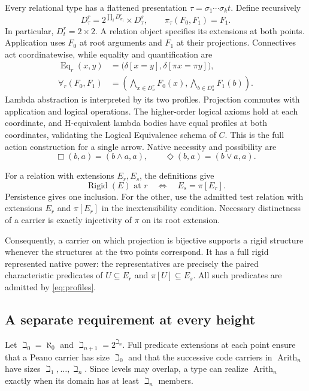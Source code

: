 \documentclass[11pt,letterpaper,numbers=noenddot]{scrartcl}
\numberwithin{equation}{section}
\theoremstyle{definition}
\newcommand{\Rigid}{\operatorname{Rigid}}
\newcommand{\Arith}{\operatorname{Arith}}
\begin{document}
Every relational type has a flattened presentation $\tau=\sigma_1\cdots\sigma_k t$. Define recursively
\begin{equation}\label{eq:profiles}
D_\tau^r=
2^{\prod_iD_{\sigma_i}^r}\times D_\tau^s,
\qquad
\pi_\tau(F_0,F_1)=F_1.
\end{equation}
In particular, $D_t^r=2\times2$. A relation object specifies its extensions at both points. Application uses $F_0$ at root arguments and $F_1$ at their projections. Connectives act coordinatewise, while equality and quantification are
\begin{align}
\operatorname{Eq}_r(x,y)
 &=\bigl(\delta[x=y],\delta[\pi x=\pi y]\bigr),\label{eq:model-eq}\\
\forall_r(F_0,F_1)
 &=\left(\bigwedge_{x\in D_\sigma^r}F_0(x),
          \bigwedge_{b\in D_\sigma^s}F_1(b)\right).
\end{align}
Lambda abstraction is interpreted by its two profiles. Projection commutes with application and logical operations. The higher-order logical axioms hold at each coordinate, and H-equivalent lambda bodies have equal profiles at both coordinates, validating the Logical Equivalence schema of $C$. This is the full action construction for a single arrow. Native necessity and possibility are
\[
\Box(b,a)=(b\land a,a),\qquad
\Diamond(b,a)=(b\lor a,a).
\]

For a relation with extensions $E_r,E_s$, the definitions give
\begin{equation}\label{eq:model-rigid}
\Rigid(E)\text{ at }r\quad\Longleftrightarrow\quad
E_s=\pi[E_r].
\end{equation}
Persistence gives one inclusion. For the other, use the admitted test relation with extensions $E_r$ and $\pi[E_r]$ in the inextensibility condition. Necessary distinctness of a carrier is exactly injectivity of $\pi$ on its root extension.

Consequently, a carrier on which projection is bijective supports a rigid structure whenever the structures at the two points correspond. It has a full rigid represented native power: the representatives are precisely the paired characteristic predicates of $U\subseteq E_r$ and $\pi[U]\subseteq E_s$. All such predicates are admitted by \eqref{eq:profiles}.

\subsection{A separate requirement at every height}

Let $\beth_0=\aleph_0$ and $\beth_{n+1}=2^{\beth_n}$. Full predicate extensions at each point ensure that a Peano carrier has size $\beth_0$ and that the successive code carriers in $\Arith_n$ have sizes $\beth_1,\ldots,\beth_n$. Since levels may overlap, a type can realize $\Arith_n$ exactly when its domain has at least $\beth_n$ members.
\end{document}
